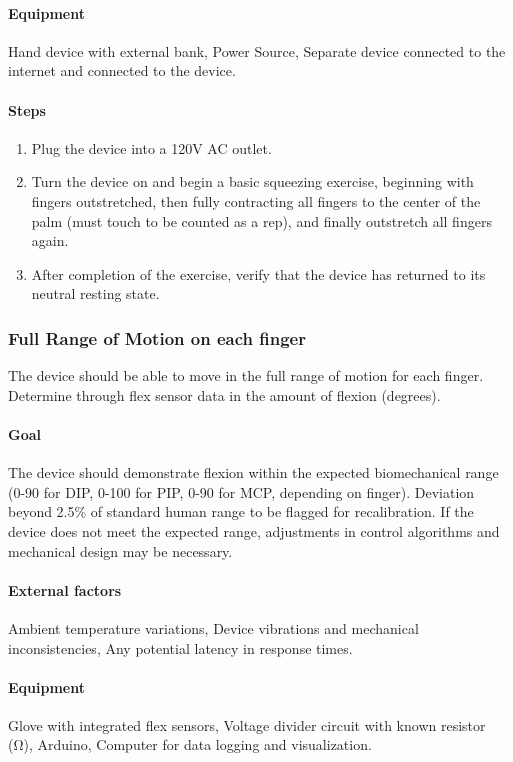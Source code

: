\documentclass{article}
\begin{document}
\paragraph{Equipment} Hand device with external bank, Power Source, Separate device connected to the internet and connected to the device.

\paragraph{Steps}
\begin{enumerate}
\item Plug the device into a 120V AC outlet.
\item Turn the device on and begin a basic squeezing exercise, beginning with fingers outstretched, then fully contracting all fingers to the center of the palm (must touch to be counted as a rep), and finally outstretch all fingers again.
\item After completion of the exercise, verify that the device has returned to its neutral resting state.
\end{enumerate}

\subsubsection{Full Range of Motion on each finger}
The device should be able to move in the full range of motion for each finger. Determine through flex sensor data in the amount of flexion (degrees).

\paragraph{Goal} The device should demonstrate flexion within the expected biomechanical range (0-90 for DIP, 0-100 for PIP, 0-90 for MCP, depending on finger). Deviation beyond 2.5\% of standard human range to be flagged for recalibration. If the device does not meet the expected range, adjustments in control algorithms and mechanical design may be necessary.

\paragraph{External factors} Ambient temperature variations, Device vibrations and mechanical inconsistencies, Any potential latency in response times.

\paragraph{Equipment} Glove with integrated flex sensors, Voltage divider circuit with known resistor (\si{\ohm}), Arduino, Computer for data logging and visualization.
\end{document}
